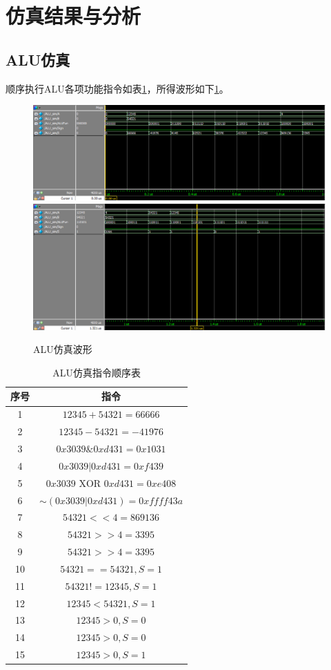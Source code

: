 \documentclass{ctexart}
\begin{document}
	\section{仿真结果与分析}
	\subsection{ALU仿真}
	顺序执行ALU各项功能指令如表\ref{simtable1}，所得波形如下\ref{simpicture1}。
	\begin{figure}[ht]
		\centering
		\includegraphics[width = \textwidth]{ALUsim-1.eps}
		\includegraphics[width = \textwidth]{ALUsim-2.eps}
		\caption{ALU仿真波形}
		\label{simpicture1}
	\end{figure}

	\begin{table}[ht]
		\centering
		\begin{tabular}{c|c}
			\hline
				序号 & 指令 \\
			\hline
				1 & $12345 + 54321 = 66666$ \\
				2 & $12345 - 54321 = -41976$ \\
				3 & $0x3039 \& 0xd431 = 0x1031$ \\
				4 & $0x3039 | 0xd431 = 0xf439$ \\
				5 & $0x3039  \text{ XOR }  0xd431 = 0xe408$ \\
				6 & $\sim(0x3039 | 0xd431) = 0xffff43a$  \\
				7 & $54321 << 4 = 869136$\\
				8 & $54321 >> 4 = 3395$\\
				9 & $54321 >> 4 = 3395$\\
				10 & $54321 == 54321, S = 1$\\
				11 & $54321 != 12345, S = 1$\\
				12 & $12345 < 54321, S = 1$\\
				13 & $12345 > 0, S = 0$ \\
				14 & $12345 > 0, S = 0$ \\
				15 & $12345 > 0, S = 1$ \\
			\hline
		\end{tabular}
		\caption{ALU仿真指令顺序表}
		\label{simtable1}
	\end{table}
\end{document}
